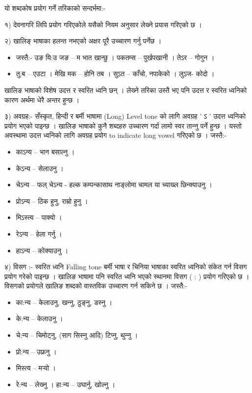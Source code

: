 यो शब्दकोष प्रयोग गर्ने तरिकाको सन्दर्भमा:-

१)	देवनागरि लिपि प्रयोग गरिएकोले यसैको नियम अनुसार लेख्‍ने प्रयास गरिएको छ ।

२)	खालिङ् भाषाका हलन्त नभएको अक्षर पूरै उच्‍चारण गर्नु पर्नेछ । 
\begin{itemize}
\item जस्तै:- उङ यि:उ जङ – म भात खान्छु । पकतम्स – पुर्खपखानी । तेऽर – गोगुन ।
\item  तु:ब – एउटा । मेखि मक – होनि तब । सुऽत – काँचो, नपाकेको । लुऽज- कोदो । 
\end{itemize}
खालिङ भाषाको विशेष उदत्त र स्वरित ध्वनि छन् । लेख्‍ने तरिका उस्तै भए पनि उदत्त र स्वरित ध्वनिको कारण अर्थमा धेरै अन्तर हुन्छ ।

३) अवग्रह:- सँस्कृत, हिन्दी र बर्मी भाषामा (Long) Level tone को लागि अवग्रह  ' ऽ ' उदत्त ध्वनिको प्रयोग भएको पाइन्छ । खालिङ भाषाको कुनै शब्दहरु उच्‍चारण गर्दा लामो स्वर तान्‍नु पर्ने हुन्छ । यस्तो अवस्थामा उदत्त ध्वनिको लागि अवग्रह प्रयोग to indicate long vowel गरिएको छ । जस्तै:-
\begin{itemize}
\item काऽन्य – भान बसाल्‍नु ।
\item केऽन्य – सेलाउनु ।
\item चेऽन्य – फल् चेऽन्य - हल्क कम्पन्कासाथ नाङ्लोमा चामल या च्याख्ल छिन्क्याउनु ।
\item प्रोऽन्य – ठिक हुनु, राम्रो हुनु ।
\item मिऽस्त्य – पाक्यो । 
\item रेऽन्य – हेला गर्नु ।
\item हाऽन्य – कोक्याउनु ।
\end{itemize}

४) विस\reph{}ग :-	 स्वरित ध्वनि Falling tone
बर्मी भाषा र चिनिया भाषाका स्वरित ध्वनिको संकेत गर्न विस\reph{}ग प्रयोग गरेको पाइन्छ । खालिङ भाषामा पनि स्वरित ध्वनि भएको स्थानमा विस\reph{}ग ( : ) प्रयोग गरिएको छ । विस\reph{}गको प्रयोगले खालिङ शब्दको वास्तविक उच्‍चारण गर्न सकिने छ । 
जस्तै:-
\begin{itemize}
\item  का:न्य – केलाउनु, खन्‍नु, ठुङ्‍नु, डस्‍नु ।
\item  के:न्य – केलाउनु ।
\item  चे:न्य – चिमोट्‍नु, (साग सिस्‍नु आदि) टिप्‍नु, थुन्‍नु ।
\item  प्रो:न्य – उफ्रनु । 
\item  मिस्त्य –  मर्‍यो ।
\item  रे:न्य – लेख्‍नु । 
हा:न्य – उघार्नु, खोल्‍नु ।
\end{itemize}

